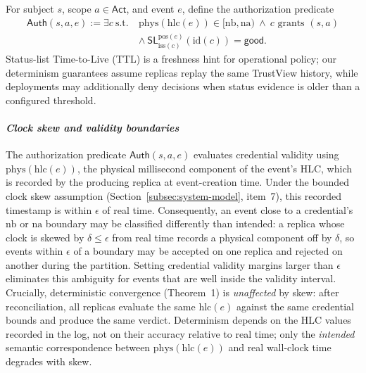\documentclass[10pt,journal,compsoc]{IEEEtran}
\begin{document}
For subject $s$, scope $a\!\in\!\mathsf{Act}$, and event $e$, define the authorization predicate
\[
\begin{aligned}
\mathsf{Auth}(s,a,e) := \exists c\ \text{s.t.}\ & \mathrm{phys}(\mathrm{hlc}(e)) \in [\mathrm{nb},\mathrm{na})\ \land\ c \text{ grants }(s,a)\\
& \land\ \mathsf{SL}^{\mathrm{pos}(e)}_{\mathrm{iss}(c)}(\mathrm{id}(c))=\mathsf{good}.
\end{aligned}
\]
Status-list Time-to-Live (TTL) is a freshness hint for operational policy; our determinism guarantees assume replicas replay the same TrustView history, while deployments may additionally deny decisions when status evidence is older than a configured threshold.

\paragraph*{\textit{Clock skew and validity boundaries}} The authorization predicate $\mathsf{Auth}(s,a,e)$ evaluates credential validity using $\mathrm{phys}(\mathrm{hlc}(e))$, the physical millisecond component of the event's HLC, which is recorded by the producing replica at event-creation time. Under the bounded clock skew assumption (Section~\ref{subsec:system-model}, item~7), this recorded timestamp is within $\epsilon$ of real time. Consequently, an event close to a credential's $\mathrm{nb}$ or $\mathrm{na}$ boundary may be classified differently than intended: a replica whose clock is skewed by $\delta \le \epsilon$ from real time records a physical component off by $\delta$, so events within $\epsilon$ of a boundary may be accepted on one replica and rejected on another during the partition. Setting credential validity margins larger than $\epsilon$ eliminates this ambiguity for events that are well inside the validity interval. Crucially, deterministic convergence (Theorem~1) is \emph{unaffected} by skew: after reconciliation, all replicas evaluate the same $\mathrm{hlc}(e)$ against the same credential bounds and produce the same verdict. Determinism depends on the HLC values recorded in the log, not on their accuracy relative to real time; only the \emph{intended} semantic correspondence between $\mathrm{phys}(\mathrm{hlc}(e))$ and real wall-clock time degrades with skew.
\end{document}
